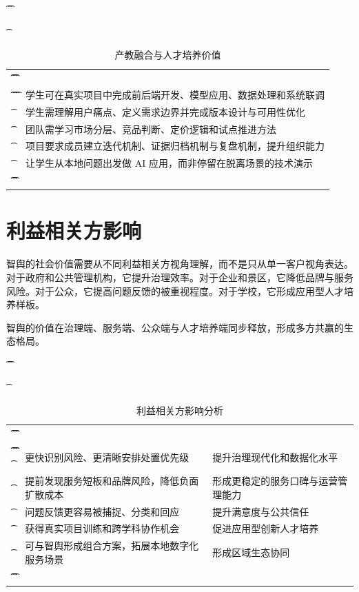 \begin{table}[htbp]
	\t\centering
	\t\caption{产教融合与人才培养价值}
	\t\begin{tabularx}{\textwidth}{|L{3cm}Y|}
		\t\t\toprule
		\t\t{} &                    \\
		\t\t\midrule
		\t\t{}
		\t{}         & 学生可在真实项目中完成前后端开发、模型应用、数据处理和系统联调  \\
		\t{}         & 学生需理解用户痛点、定义需求边界并完成版本设计与可用性优化    \\
		\t{}         & 团队需学习市场分层、竞品判断、定价逻辑和试点推进方法       \\
		\t{}         & 项目要求成员建立迭代机制、证据归档机制与复盘机制，提升组织能力  \\
		\t{}       & 让学生从本地问题出发做 AI 应用，而非停留在脱离场景的技术演示 \\
		\t\t\bottomrule
		\t\end{tabularx}
\end{table}

\section{利益相关方影响}

智舆的社会价值需要从不同利益相关方视角理解，而不是只从单一客户视角表达。对于政府和公共管理机构，它提升治理效率。对于企业和景区，它降低品牌与服务风险。对于公众，它提高问题反馈的被重视程度。对于学校，它形成应用型人才培养样板。

智舆的价值在治理端、服务端、公众端与人才培养端同步释放，形成多方共赢的生态格局。

\begin{table}[htbp]
	\t\centering
	\t\caption{利益相关方影响分析}
	\t\begin{tabularx}{\textwidth}{|L{3cm}YL{2.8cm}|}
		\t\t\toprule
		\t\t{} &          &  \\
		\t\t\midrule
		\t\t{}
		\t{}          & 更快识别风险、更清晰安排处置优先级      & 提升治理现代化和数据化水平     \\
		\t{}           & 提前发现服务短板和品牌风险，降低负面扩散成本 & 形成更稳定的服务口碑与运营管理能力 \\
		\t{}           & 问题反馈更容易被捕捉、分类和回应       & 提升满意度与公共信任        \\
		\t{}         & 获得真实项目训练和跨学科协作机会       & 促进应用型创新人才培养       \\
		\t{}        & 可与智舆形成组合方案，拓展本地数字化服务场景 & 形成区域生态协同          \\
		\t\t\bottomrule
		\t\end{tabularx}
\end{table}

